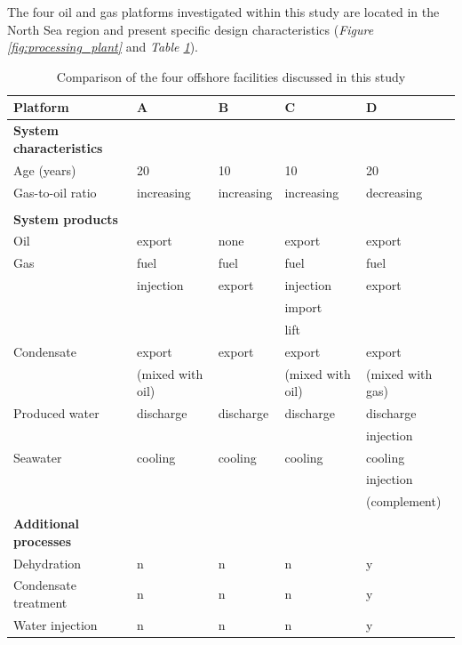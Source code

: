 The four oil and gas platforms investigated within this study are located in the North Sea region and present specific design characteristics (\emph{Figure \ref{fig:processing_plant}} and \emph{Table \ref{tab:platform_characteristics}}). 

\begin{table}[htbp]
\scriptsize
  \centering
  \caption{Comparison of the four offshore facilities discussed in this study}
    \begin{tabular}{lllll}
    \toprule
    \textbf{Platform} & A     & B     & C     & D \\
    \midrule
    \textbf{System characteristics} &       &       &       &  \\
    Age (years) & 20    & 10    & 10    & 20 \\
    Gas-to-oil ratio & increasing & increasing & increasing & decreasing \\
    \textbf{} &       &       &       &  \\
    \textbf{System products} &       &       &       &  \\
    Oil   & export & none  & export & export \\
    Gas   & fuel  & fuel  & fuel  & fuel \\
          & injection & export & injection & export \\
          &       &       & import &  \\
          &       &       & lift  &  \\
    Condensate & export & export & export & export \\
          & (mixed with oil) &       & (mixed with oil) & (mixed with gas) \\
    Produced water & discharge & discharge & discharge & discharge \\
          &       &       &       & injection \\
    Seawater & cooling & cooling & cooling & cooling \\
          &       &       &       & injection \\
          &       &       &       & (complement) \\
    \textbf{Additional processes} &       &       &       &  \\
    Dehydration & n     & n     & n     & y \\
    Condensate treatment & n     & n     & n     & y \\
    Water injection  & n     & n     & n     & y \\
    \bottomrule
    \end{tabular}%
  \label{tab:platform_characteristics}%
\end{table}%


